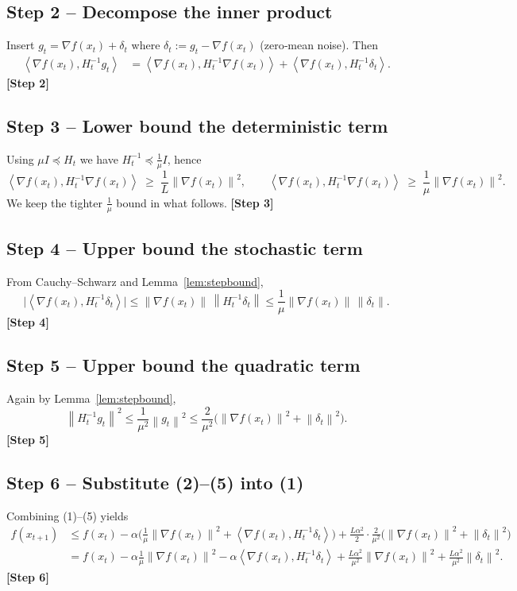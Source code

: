 \documentclass{article}
\newcommand{\norm}[1]{\left\|#1\right\|}
\newcommand{\inner}[2]{\left\langle #1,#2\right\rangle}
\newcommand{\grad}{\nabla}
\begin{document}
\subsection*{Step 2 – Decompose the inner product}
Insert $g_{t}= \grad f(x_{t}) + \delta_{t}$ where $\delta_{t}:=g_{t}-\grad f(x_{t})$ (zero‑mean noise). Then
\begin{align}
\inner{\grad f(x_{t})}{H_{t}^{-1}g_{t}}
&=\inner{\grad f(x_{t})}{H_{t}^{-1}\grad f(x_{t})}
  +\inner{\grad f(x_{t})}{H_{t}^{-1}\delta_{t}} .\tag{2}
\end{align}
\noindent\textbf{[Step 2]}

\subsection*{Step 3 – Lower bound the deterministic term}
Using $\mu I\preceq H_{t}$ we have $H_{t}^{-1}\preceq \frac{1}{\mu}I$, hence
\[
\inner{\grad f(x_{t})}{H_{t}^{-1}\grad f(x_{t})}
\;\ge\;\frac{1}{L}\norm{\grad f(x_{t})}^{2},
\qquad
\inner{\grad f(x_{t})}{H_{t}^{-1}\grad f(x_{t})}
\;\ge\;\frac{1}{\mu}\norm{\grad f(x_{t})}^{2}. \tag{3}
\]
We keep the tighter $\frac{1}{\mu}$ bound in what follows.
\noindent\textbf{[Step 3]}

\subsection*{Step 4 – Upper bound the stochastic term}
From Cauchy–Schwarz and Lemma~\ref{lem:stepbound},
\[
\big|\inner{\grad f(x_{t})}{H_{t}^{-1}\delta_{t}}\big|
\le \norm{\grad f(x_{t})}\,\norm{H_{t}^{-1}\delta_{t}}
\le \frac{1}{\mu}\norm{\grad f(x_{t})}\,\norm{\delta_{t}}. \tag{4}
\]
\noindent\textbf{[Step 4]}

\subsection*{Step 5 – Upper bound the quadratic term}
Again by Lemma~\ref{lem:stepbound},
\[
\norm{H_{t}^{-1}g_{t}}^{2}
\le\frac{1}{\mu^{2}}\norm{g_{t}}^{2}
\le\frac{2}{\mu^{2}}\big(\norm{\grad f(x_{t})}^{2}+\norm{\delta_{t}}^{2}\big). \tag{5}
\]
\noindent\textbf{[Step 5]}

\subsection*{Step 6 – Substitute (2)–(5) into (1)}
Combining (1)–(5) yields
\begin{align}
f(x_{t+1})
&\le f(x_{t})
   -\alpha\Big(\frac{1}{\mu}\norm{\grad f(x_{t})}^{2}
               +\inner{\grad f(x_{t})}{H_{t}^{-1}\delta_{t}}\Big)
   +\frac{L\alpha^{2}}{2}\cdot\frac{2}{\mu^{2}}
      \big(\norm{\grad f(x_{t})}^{2}+\norm{\delta_{t}}^{2}\big) \nonumber\\[4pt]
&= f(x_{t})
   -\alpha\frac{1}{\mu}\norm{\grad f(x_{t})}^{2}
   -\alpha\inner{\grad f(x_{t})}{H_{t}^{-1}\delta_{t}}
   +\frac{L\alpha^{2}}{\mu^{2}}\norm{\grad f(x_{t})}^{2}
   +\frac{L\alpha^{2}}{\mu^{2}}\norm{\delta_{t}}^{2}. \tag{6}
\end{align}
\noindent\textbf{[Step 6]}
\end{document}
